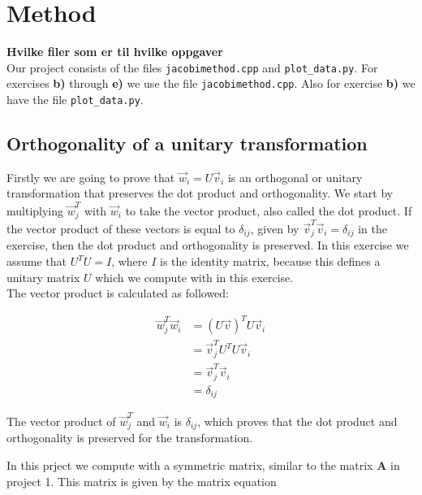 \documentclass{article}
\begin{document}
\section{Method} \label{sec:Method}

\textbf{Hvilke filer som er til hvilke oppgaver} \\

Our project consists of the files \texttt{jacobimethod.cpp} and \texttt{plot\_data.py}. For exercises \textbf{b)} through \textbf{e)} we use the file \texttt{jacobimethod.cpp}. Also for exercise \textbf{b)} we have the file \texttt{plot\_data.py}.

\subsection{Orthogonality of a unitary transformation} \label{sec:orthogonality}

Firstly we are going to prove that $\vec{w}_i = U \vec{v}_i$ is an orthogonal or unitary transformation that preserves the dot product and orthogonality. We start by multiplying $\vec{w}_j ^T$ with $\vec{w}_i$ to take the vector product, also called the dot product. If the vector product of these vectors is equal to $\delta_{ij}$, given by $\vec{v}_j ^T \vec{v}_i = \delta_{ij}$ in the exercise, then the dot product and orthogonality is preserved. In this exercise we assume that $U^T U = I$, where $I$ is the identity matrix, because this defines a unitary matrix $U$ which we compute with in this exercise. \\

The vector product is calculated as followed:

\begin{align*}
  \vec{w}_j ^T \vec{w}_i &= (U \vec{v})^T U \vec{v}_i \\
  &= \vec{v}_j ^T U^T U \vec{v}_i \\
  &= \vec{v}_j ^T \vec{v}_i \\
  &= \delta _{ij}
\end{align*}

The vector product of $\vec{w}_j ^T$ and $\vec{w}_i$ is $\delta_{ij}$, which proves that the dot product and orthogonality is preserved for the transformation.

In this prject we compute with a symmetric matrix, similar to the matrix \textbf{A} in project 1. This matrix is given by the matrix equation
\end{document}
